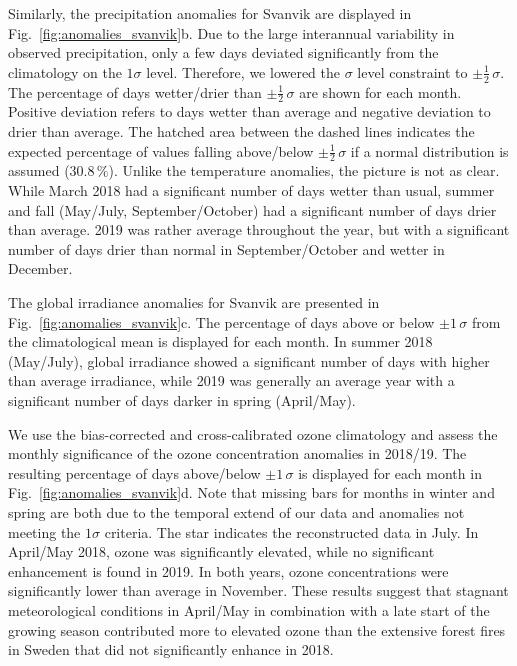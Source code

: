 \documentclass[bg, manuscript]{copernicus}
\begin{document}
Similarly, the precipitation anomalies for Svanvik are displayed in Fig.~\ref{fig:anomalies_svanvik}b. Due to the large interannual variability in observed precipitation, only a few days deviated significantly from the climatology on the $1 \sigma$ level. Therefore, we lowered the $\sigma$ level constraint to $\pm \frac{1}{2}\,\sigma$. The percentage of days wetter/drier than $\pm \frac{1}{2}\,\sigma$ are shown for each month. Positive deviation refers to days wetter than average and negative deviation to drier than average. The hatched area between the dashed lines indicates the expected percentage of values falling above/below $\pm\frac{1}{2}\,\sigma$ if a normal distribution is assumed ($30.8\,\unit{\%}$). Unlike the temperature anomalies, the picture is not as clear. While March 2018 had a significant number of days wetter than usual, summer and fall (May/July, September/October) had a significant number of days drier than average. 2019 was rather average throughout the year, but with a significant number of days drier than normal in September/October and wetter in December.

The global irradiance anomalies for Svanvik are presented in Fig.~\ref{fig:anomalies_svanvik}c. The percentage of days above or below $\pm 1\,\sigma$ from the climatological mean is displayed for each month. In summer 2018 (May/July), global irradiance showed a significant number of days with higher than average irradiance, while 2019 was generally an average year with a significant number of days darker in spring (April/May).

We use the bias-corrected and cross-calibrated ozone climatology \citep{ACPD:Falk2021} and assess the monthly significance of the ozone concentration anomalies in 2018/19. The resulting percentage of days above/below $\pm 1\,\sigma$ is displayed for each month in Fig.~\ref{fig:anomalies_svanvik}d. Note that missing bars for months in winter and spring are both due to the temporal extend of our data and anomalies not meeting the $1\sigma$ criteria. The star indicates the reconstructed data in July. In April/May 2018, ozone was significantly elevated, while no significant enhancement is found in 2019. In both years, ozone concentrations were significantly lower than average in November. These results suggest that stagnant meteorological conditions in April/May in combination with a late start of the growing season contributed more to elevated ozone than the extensive forest fires in Sweden that did not significantly enhance \chem{[O_3]} in 2018.
\end{document}

